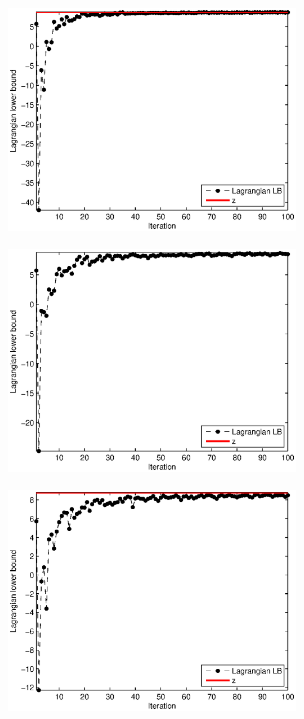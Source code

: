 \begin{figure}[!ht]
\centering
\begin{minipage}{0.49\textwidth}
\includegraphics[width=3.0in]{./p4/ex7_4_klogk}
\label{fig: ex7_4_klogk}
\end{minipage}
\end{figure}

\begin{figure}[!ht]
\centering
\begin{minipage}{0.49\textwidth}
\includegraphics[width=3.0in]{./p4/ex7_4_2k}
\label{fig: ex7_4_2k}
\end{minipage}
\begin{minipage}{0.49\textwidth}
\includegraphics[width=3.0in]{./p4/ex7_4_2k1}
\label{fig: ex7_4_2k1}
\end{minipage}
\end{figure}

